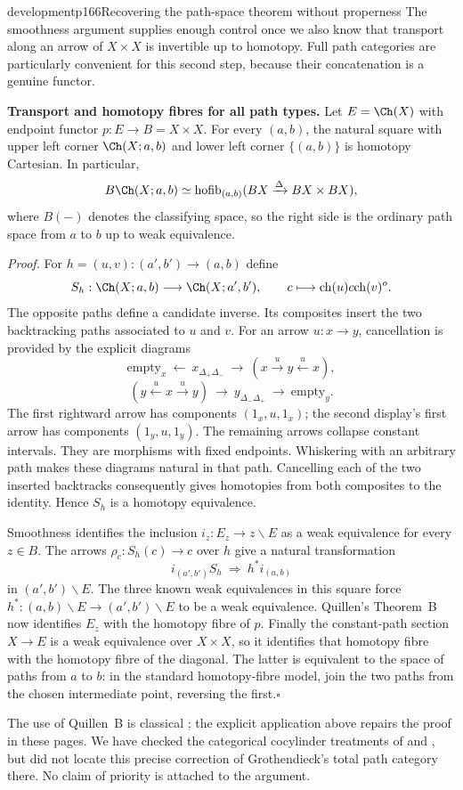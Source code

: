 \begin{dcomment}{development}{p166}{Recovering the path-space theorem without properness}
The smoothness argument supplies enough control once we also know that transport along an arrow of $X\times X$ is invertible up to homotopy. Full path categories are particularly convenient for this second step, because their concatenation is a genuine functor.

\textbf{Transport and homotopy fibres for all path types.}\ours\quad
Let $E=\Ch(X)$ with endpoint functor $p:E\to B=X\times X$. For every $(a,b)$, the natural square with upper left corner $\Ch(X;a,b)$ and lower left corner $\{(a,b)\}$ is homotopy Cartesian. In particular,
\[
 B\Ch(X;a,b)\simeq
 \operatorname{hofib}_{(a,b)}(BX\xrightarrow{\Delta}BX\times BX),
\]
where $B(-)$ denotes the classifying space, so the right side is the ordinary path space from $a$ to $b$ up to weak equivalence.

\emph{Proof.} For $h=(u,v):(a',b')\to(a,b)$ define
\[
 S_h:\Ch(X;a,b)\longrightarrow\Ch(X;a',b'),
 \qquad c\longmapsto\mathrm{ch}(u)c\mathrm{ch}(v)^o.
\]
The opposite paths define a candidate inverse. Its composites insert the two backtracking paths associated to $u$ and $v$. For an arrow $u:x\to y$, cancellation is provided by the explicit diagrams
\[
 \text{empty}_x\ \longleftarrow\ x_{\Delta_+\Delta_-}
 \ \longrightarrow\ (x\xrightarrow{u}y\xleftarrow{u}x),
\]
\[
 (y\xleftarrow{u}x\xrightarrow{u}y)
 \ \longrightarrow\ y_{\Delta_-\Delta_+}
 \ \longrightarrow\ \text{empty}_y.
\]
The first rightward arrow has components $(1_x,u,1_x)$; the second display's first arrow has components $(1_y,u,1_y)$. The remaining arrows collapse constant intervals. They are morphisms with fixed endpoints. Whiskering with an arbitrary path makes these diagrams natural in that path. Cancelling each of the two inserted backtracks consequently gives homotopies from both composites to the identity. Hence $S_h$ is a homotopy equivalence.

Smoothness identifies the inclusion $i_z:E_z\to z\backslash E$ as a weak equivalence for every $z\in B$. The arrows $\rho_c:S_h(c)\to c$ over $h$ give a natural transformation
\[
 i_{(a',b')}S_h\ \Longrightarrow\ h^*i_{(a,b)}
\]
in $(a',b')\backslash E$. The three known weak equivalences in this square force $h^*:(a,b)\backslash E\to(a',b')\backslash E$ to be a weak equivalence. Quillen's Theorem~B now identifies $E_z$ with the homotopy fibre of $p$. Finally the constant-path section $X\to E$ is a weak equivalence over $X\times X$, so it identifies that homotopy fibre with the homotopy fibre of the diagonal. The latter is equivalent to the space of paths from $a$ to $b$: in the standard homotopy-fibre model, join the two paths from the chosen intermediate point, reversing the first.\hfill$\square$

The use of Quillen~B is classical \citep[\S1]{Quillen1973}; the explicit application above repairs the proof in these pages. We have checked the categorical cocylinder treatments of \citet{Evrard1975} and \citet{Shoikhet2016}, but did not locate this precise correction of Grothendieck's total path category there. No claim of priority is attached to the argument.
\end{dcomment}

